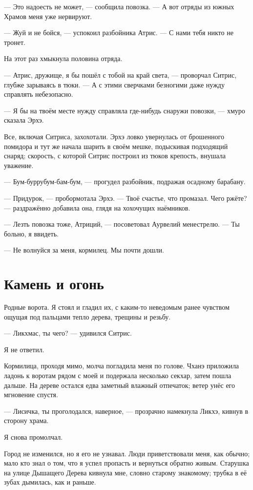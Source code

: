 --- Это надоесть не может, --- сообщила повозка.
--- А вот отряды из южных Храмов меня уже нервируют.

--- Жуй и не бойся, --- успокоил разбойника Атрис.
--- С нами тебя никто не тронет.

На этот раз хмыкнула половина отряда.

--- Атрис, дружище, я бы пошёл с тобой на край света, --- проворчал Ситрис, глубже зарываясь в тюки.
--- А с этими сверчками безногими даже нужду справлять небезопасно.

--- Я бы на твоём месте нужду справляла где-нибудь снаружи повозки, --- хмуро сказала Эрхэ.

Все, включая Ситриса, захохотали.
Эрхэ ловко увернулась от брошенного помидора и тут же начала шарить в своём мешке, подыскивая подходящий снаряд;
скорость, с которой Ситрис построил из тюков крепость, внушала уважение.

--- Бум-буррубум-бам-бум\FM, --- прогудел разбойник, подражая осадному барабану.

--- Придурок, --- пробормотала Эрхэ.
--- Твоё счастье, что промазал.
Чего ржёте? --- раздражённо добавила она, глядя на хохочущих наёмников.

--- Лезть повозка тоже, Атриций, --- посоветовал Аурвелий менестрелю.
--- Ты больно, я ввидеть.

--- Не волнуйся за меня, кормилец.
Мы почти дошли.

\section{Камень и огонь}

Родные ворота.
Я стоял и гладил их, с каким-то неведомым ранее чувством ощущая под пальцами тепло дерева, трещины и резьбу.

--- Ликхмас, ты чего? --- удивился Ситрис.

Я не ответил.

Кормилица, проходя мимо, молча погладила меня по голове.
Чханэ приложила ладонь к воротам рядом с моей и подержала несколько секхар, затем пошла дальше.
На дереве остался едва заметный влажный отпечаток;
ветер унёс его мгновение спустя.

--- Лисичка, ты проголодался, наверное, --- прозрачно намекнула Ликхэ, кивнув в сторону храма.

Я снова промолчал.

Город не изменился, но я его не узнавал.
Люди приветствовали меня, как обычно;
мало кто знал о том, что я успел пропасть и вернуться обратно живым.
Старушка на улице Дышащего Дерева кивнула мне, словно старому знакомому;
трубка в её зубах дымилась, как и раньше.

